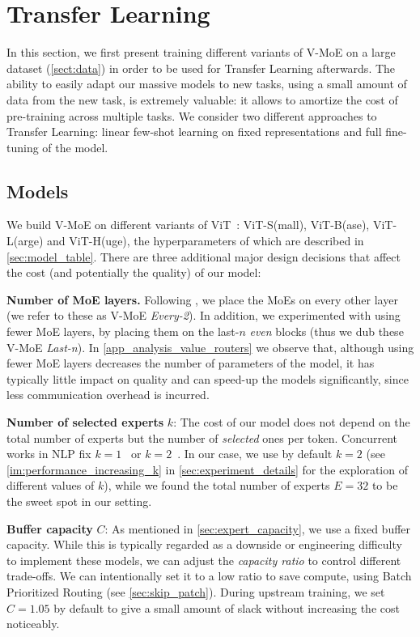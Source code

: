 \documentclass{article}
\newcommand{\abbv}{{V-MoE}}
\begin{document}
 \section{Transfer Learning}
In this section, we first present training different variants of \abbv{} on a large dataset 
(\cref{sect:data}) in order to
be used for Transfer Learning afterwards. The ability to easily adapt our massive models to new tasks,
using a small amount of data from the new task, is extremely valuable: it allows to amortize the cost 
of pre-training across multiple tasks. 
We consider two different approaches to Transfer Learning:
linear few-shot learning on fixed representations and full fine-tuning of the model.




\subsection{Models}
We build V-MoE on different variants of ViT~\cite{dosovitskiy2020image}:
ViT-S(mall), ViT-B(ase), ViT-L(arge) and ViT-H(uge), the hyperparameters of which are described in \cref{sec:model_table}.
There are three additional major design decisions that affect the cost (and potentially the quality) of our model:

\textbf{Number of MoE layers.}
Following \cite{lepikhin2020gshard}, we place the MoEs on every other layer (we refer to these as \abbv{} \emph{Every-2}).
In addition, we experimented with using fewer MoE layers, by placing them on the last-$n$ \emph{even} blocks 
(thus we dub these \abbv{} \emph{Last-n}). In \cref{app_analysis_value_routers} we observe that, although using fewer MoE 
layers decreases the number of parameters of the model, it has typically little impact on quality and can speed-up the models significantly,
since less communication overhead is incurred.

\textbf{Number of selected experts} $k$:
The cost of our model does not depend on the total number of experts but the number of \emph{selected} ones per token. 
Concurrent works in NLP fix $k = 1$~\cite{fedus2021switch} or $k = 2$~\cite{shazeer2017outrageously,lepikhin2020gshard}.
In our case, we use by default $k = 2$ (see \cref{im:performance_increasing_k} in \cref{sec:experiment_details} for the exploration of different values of $k$), while we found the total number of experts $E = 32$ to be the sweet spot in our setting.

\textbf{Buffer capacity} $C$:
As mentioned in \cref{sec:expert_capacity}, we use a fixed buffer capacity. While this is typically regarded as a downside or engineering difficulty to implement these models, we can adjust the \emph{capacity ratio} to control different trade-offs. We can intentionally
set it to a low ratio to save compute, using Batch Prioritized Routing (see \cref{sec:skip_patch}). 
During upstream training, we set $C = 1.05$ by default to give a small amount of slack without increasing the cost noticeably.
\end{document}
